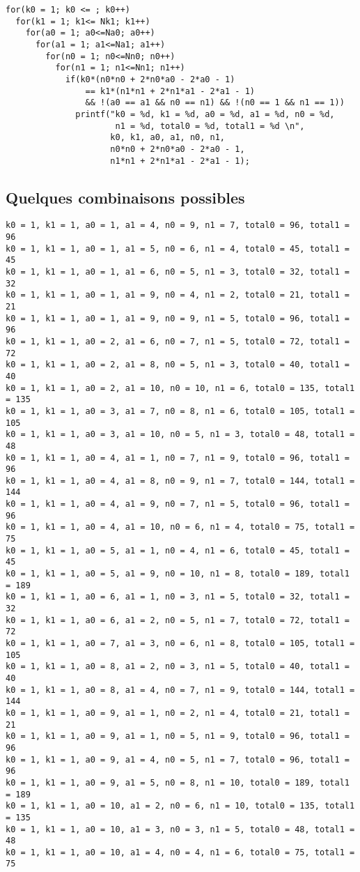 \documentclass{article}
\begin{document}
\begin{lstlisting}
for(k0 = 1; k0 <= ; k0++)
  for(k1 = 1; k1<= Nk1; k1++)
    for(a0 = 1; a0<=Na0; a0++)
      for(a1 = 1; a1<=Na1; a1++)
      	for(n0 = 1; n0<=Nn0; n0++)
      	  for(n1 = 1; n1<=Nn1; n1++)
       	  	if(k0*(n0*n0 + 2*n0*a0 - 2*a0 - 1) 
       	  		== k1*(n1*n1 + 2*n1*a1 - 2*a1 - 1) 
       	        && !(a0 == a1 && n0 == n1) && !(n0 == 1 && n1 == 1))
          	  printf("k0 = %d, k1 = %d, a0 = %d, a1 = %d, n0 = %d, 
          	  	      n1 = %d, total0 = %d, total1 = %d \n",
          	         k0, k1, a0, a1, n0, n1, 
          	         n0*n0 + 2*n0*a0 - 2*a0 - 1, 
          	         n1*n1 + 2*n1*a1 - 2*a1 - 1);

\end{lstlisting}
\subsection{Quelques combinaisons possibles}
\begin{lstlisting}
k0 = 1, k1 = 1, a0 = 1, a1 = 4, n0 = 9, n1 = 7, total0 = 96, total1 = 96
k0 = 1, k1 = 1, a0 = 1, a1 = 5, n0 = 6, n1 = 4, total0 = 45, total1 = 45
k0 = 1, k1 = 1, a0 = 1, a1 = 6, n0 = 5, n1 = 3, total0 = 32, total1 = 32
k0 = 1, k1 = 1, a0 = 1, a1 = 9, n0 = 4, n1 = 2, total0 = 21, total1 = 21
k0 = 1, k1 = 1, a0 = 1, a1 = 9, n0 = 9, n1 = 5, total0 = 96, total1 = 96
k0 = 1, k1 = 1, a0 = 2, a1 = 6, n0 = 7, n1 = 5, total0 = 72, total1 = 72
k0 = 1, k1 = 1, a0 = 2, a1 = 8, n0 = 5, n1 = 3, total0 = 40, total1 = 40
k0 = 1, k1 = 1, a0 = 2, a1 = 10, n0 = 10, n1 = 6, total0 = 135, total1 = 135
k0 = 1, k1 = 1, a0 = 3, a1 = 7, n0 = 8, n1 = 6, total0 = 105, total1 = 105
k0 = 1, k1 = 1, a0 = 3, a1 = 10, n0 = 5, n1 = 3, total0 = 48, total1 = 48
k0 = 1, k1 = 1, a0 = 4, a1 = 1, n0 = 7, n1 = 9, total0 = 96, total1 = 96
k0 = 1, k1 = 1, a0 = 4, a1 = 8, n0 = 9, n1 = 7, total0 = 144, total1 = 144
k0 = 1, k1 = 1, a0 = 4, a1 = 9, n0 = 7, n1 = 5, total0 = 96, total1 = 96
k0 = 1, k1 = 1, a0 = 4, a1 = 10, n0 = 6, n1 = 4, total0 = 75, total1 = 75
k0 = 1, k1 = 1, a0 = 5, a1 = 1, n0 = 4, n1 = 6, total0 = 45, total1 = 45
k0 = 1, k1 = 1, a0 = 5, a1 = 9, n0 = 10, n1 = 8, total0 = 189, total1 = 189
k0 = 1, k1 = 1, a0 = 6, a1 = 1, n0 = 3, n1 = 5, total0 = 32, total1 = 32
k0 = 1, k1 = 1, a0 = 6, a1 = 2, n0 = 5, n1 = 7, total0 = 72, total1 = 72
k0 = 1, k1 = 1, a0 = 7, a1 = 3, n0 = 6, n1 = 8, total0 = 105, total1 = 105
k0 = 1, k1 = 1, a0 = 8, a1 = 2, n0 = 3, n1 = 5, total0 = 40, total1 = 40
k0 = 1, k1 = 1, a0 = 8, a1 = 4, n0 = 7, n1 = 9, total0 = 144, total1 = 144
k0 = 1, k1 = 1, a0 = 9, a1 = 1, n0 = 2, n1 = 4, total0 = 21, total1 = 21
k0 = 1, k1 = 1, a0 = 9, a1 = 1, n0 = 5, n1 = 9, total0 = 96, total1 = 96
k0 = 1, k1 = 1, a0 = 9, a1 = 4, n0 = 5, n1 = 7, total0 = 96, total1 = 96
k0 = 1, k1 = 1, a0 = 9, a1 = 5, n0 = 8, n1 = 10, total0 = 189, total1 = 189
k0 = 1, k1 = 1, a0 = 10, a1 = 2, n0 = 6, n1 = 10, total0 = 135, total1 = 135
k0 = 1, k1 = 1, a0 = 10, a1 = 3, n0 = 3, n1 = 5, total0 = 48, total1 = 48
k0 = 1, k1 = 1, a0 = 10, a1 = 4, n0 = 4, n1 = 6, total0 = 75, total1 = 75
\end{lstlisting} 
\end{document}
